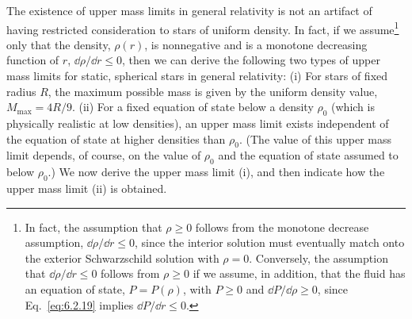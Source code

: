 The existence of upper mass limits in general relativity is not an artifact of
having restricted consideration to stars of uniform density. In fact, if we
assume\footnote{In fact, the assumption that \(\rho\geq0\) follows from the
monotone decrease assumption, \(\dd\rho/\dd r\leq0\), since the interior solution must
eventually match onto the exterior Schwarzschild solution with \(\rho=0\).
Conversely, the assumption that \(\dd\rho/\dd r\leq0\) follows from \(\rho\geq0\) if we
assume, in addition, that the fluid has an equation of state,
\(P=P(\rho)\), with \(P\geq0\) and \(\dd P/\dd\rho\geq0\), since
Eq.~\eqref{eq:6.2.19} implies \(\dd P/\dd r\leq0\).} only that the density,
\(\rho(r)\), is nonnegative and is a monotone decreasing function of \(r\),
\(\dd\rho/\dd r\leq0\), then we can derive the following two types of upper mass
limits for static, spherical stars in general relativity: (i) For stars of fixed
radius \(R\), the maximum possible mass is given by the uniform density value,
\(M_{\max}=4R/9\). (ii) For a fixed equation of state below a density \(\rho_0\)
(which is physically realistic at low densities), an upper mass limit exists
independent of the equation of state at higher densities than \(\rho_0\). (The
value of this upper mass limit depends, of course, on the value of \(\rho_0\) and
the equation of state assumed to below \(\rho_0\).) We now derive the upper mass
limit (i), and then indicate how the upper mass limit (ii) is obtained.

